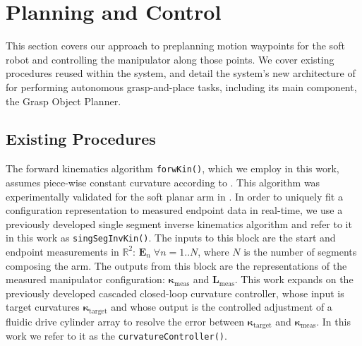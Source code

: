 \section{Planning and Control}
\label{sec:processing_and_control}
This section covers our approach to preplanning motion waypoints for the soft robot and controlling the manipulator along those points. We cover existing procedures reused within the system, and detail the system's new architecture of for performing autonomous grasp-and-place tasks, including its main component, the Grasp Object Planner.

\subsection{Existing Procedures}
The forward kinematics algorithm \texttt{forwKin()}, which we employ in this work, assumes piece-wise constant curvature according to \cite{webster2010design}. 
This algorithm was experimentally validated for the soft planar arm in \cite{marchese2014design}.
In order to uniquely fit a configuration representation to measured endpoint data in real-time, we use a previously developed single segment inverse kinematics algorithm \cite{marchese2014design} and refer to it in this work as \texttt{singSegInvKin()}.
The inputs to this block are the start and endpoint measurements in $\mathbb{R}^2$: $\mathbf{E}_n \; \forall n  = 1..N$, where $N$ is the number of segments composing the arm.
The outputs from this block are the representations of the measured manipulator configuration: $\boldsymbol{\kappa}_{\textrm{meas}}$ and $\mathbf{L}_{\textrm{meas}}$.
This work expands on the previously developed cascaded closed-loop curvature controller, whose input is target curvatures $\boldsymbol{\kappa}_{\textrm{target}}$ and whose output is the controlled adjustment of a fluidic drive cylinder array to resolve the error between $\boldsymbol{\kappa}_{\textrm{target}}$ and $\boldsymbol{\kappa}_{\textrm{meas}}$.
In this work we refer to it as the \texttt{curvatureController()}.


